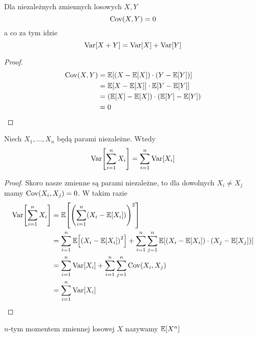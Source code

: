 \begin{theorem} Dla niezależnych zmiennych losowych \( X, Y \)
	\[
		\covariance{X}{Y} = 0
	\]
	a co za tym idzie
	\[
		\variance{X + Y} = \variance{X} + \variance{Y}
	\]
\end{theorem}
\begin{proof}
	\begin{align*}
		\covariance{X}{Y}
		 & = \expected{\pars{X - \expected{X}} \cdot \pars{Y - \expected{Y}}}            \\
		 & = \expected{X - \expected{X}} \cdot \expected{Y - \expected{Y}}               \\
		 & = \pars{\expected{X} - \expected{X}} \cdot \pars{\expected{Y} - \expected{Y}} \\
		 & = 0
	\end{align*}
\end{proof}

\begin{theorem}
	\label{variance-of-sum-of-independent-variables}
	Niech \( X_1, \dots, X_n \) będą parami niezależne. Wtedy
	\[
		\variance{\sum_{i=1}^n X_i} = \sum_{i=1}^n \variance{X_i}
	\]
\end{theorem}
\begin{proof}
	Skoro nasze zmienne są parami niezależne, to dla dowolnych \( X_i \neq X_j \) mamy \( \covariance{X_i}{X_j} = 0 \). W takim razie
	\begin{align*}
		\variance{\sum_{i=1}^n X_i}
		 & = \expected{\pars{\sum_{i=1}^n \pars{X_i - \expected{X_i}}}^2}                                  \\
		 & = \sum_{i=1}^n \expected{\pars{X_i - \expected{X_i}}^2}
		+ \sum_{i=1}^n \sum_{j=1}^n \expected{\pars{X_i - \expected{X_i}}\cdot\pars{X_j - \expected{X_j}}} \\
		 & = \sum_{i=1}^n \variance{X_i} + \sum_{i=1}^n \sum_{j=1}^n \covariance{X_i}{X_j}                 \\
		 & = \sum_{i=1}^n \variance{X_i}
	\end{align*}
\end{proof}

\begin{definition}
	\(n\)-tym momentem zmiennej losowej \( X \) nazywamy \( \expected{X^n} \)
\end{definition}
